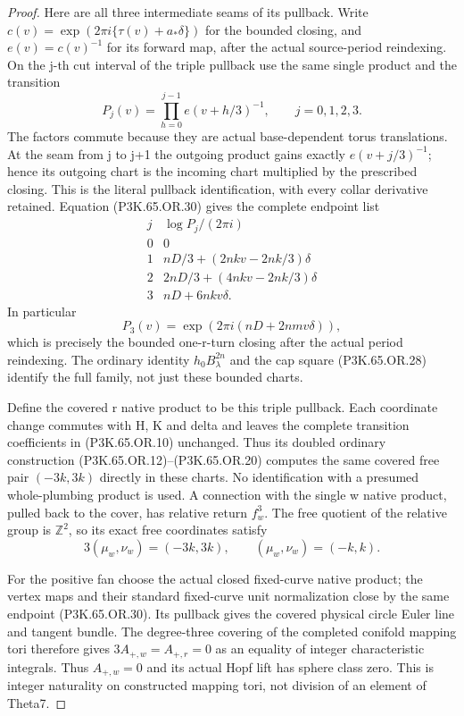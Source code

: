 \begin{proof}
Here are all three intermediate seams of its pullback. Write
\(c(v)=\exp(2\pi i\{\tau(v)+a_*\delta\})\) for the bounded
closing, and \(e(v)=c(v)^{-1}\) for its forward map, after the
actual source-period reindexing. On the j-th cut interval of the
triple pullback use the same single product and the transition
\[
            P_j(v)=\prod_{h=0}^{j-1}e(v+h/3)^{-1},
            \qquad j=0,1,2,3.                       \tag{P3K.65.OR.31}
\]
The factors commute because they are actual base-dependent torus
translations. At the seam from j to j+1 the outgoing product
gains exactly \(e(v+j/3)^{-1}\); hence its outgoing chart is
the incoming chart multiplied by the prescribed closing. This
is the literal pullback identification, with every collar
derivative retained. Equation (P3K.65.OR.30) gives
the complete endpoint list
\[
\begin{array}{c|c}
 j&\log P_j/(2\pi i)\\ \hline
 0&0\\
 1&nD/3+(2nkv-2nk/3)\delta\\
 2&2nD/3+(4nkv-2nk/3)\delta\\
 3&nD+6nkv\delta .
\end{array}
\]
In particular
\[
 P_3(v)=\exp(2\pi i(nD+2nmv\delta)),
\]
which is precisely the bounded one-r-turn closing after the
actual period reindexing. The ordinary identity
\(h_0B_\lambda^{2n}\) and the cap square (P3K.65.OR.28) identify the
full family, not just these bounded charts.

Define the covered r native product to be this triple pullback.
Each coordinate change commutes with H, K and delta and leaves
the complete transition coefficients in (P3K.65.OR.10) unchanged.
Thus its doubled ordinary construction (P3K.65.OR.12)--\allowbreak (P3K.65.OR.20)
computes the same covered free pair \((-3k,3k)\) directly in
these charts. No identification with a presumed whole-plumbing
product is used. A connection with the single w native product,
pulled back to the cover, has relative return \(f_w^3\).
The free quotient of the relative group is \(\mathbb Z^2\),
so its exact free coordinates satisfy
\[
                     3(\mu_w,\nu_w)=(-3k,3k),
                     \qquad(\mu_w,\nu_w)=(-k,k).    \tag{P3K.65.OR.32}
\]

For the positive fan choose the actual closed fixed-curve native
product; the vertex maps and their standard fixed-curve unit
normalization close by the same endpoint (P3K.65.OR.30). Its pullback
gives the covered physical circle Euler line and tangent bundle.
The degree-three covering of the completed conifold mapping tori
therefore gives \(3A_{+,w}=A_{+,r}=0\) as an equality of integer
characteristic integrals. Thus \(A_{+,w}=0\) and its actual
Hopf lift has sphere class zero. This is integer naturality on
constructed mapping tori, not division of an element of Theta7.


\end{proof}
